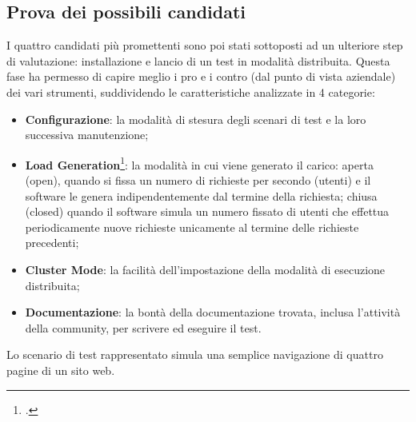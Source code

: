 \subsection{Prova dei possibili candidati}
I quattro candidati più promettenti sono poi stati sottoposti ad un ulteriore step di valutazione: installazione e lancio di un test in modalità distribuita. Questa fase ha permesso di capire meglio i pro e i contro (dal punto di vista aziendale) dei vari strumenti, suddividendo le caratteristiche analizzate in 4 categorie:
\begin{itemize}
	\item \textbf{Configurazione}: la modalità di stesura degli scenari di test e la loro successiva manutenzione;
	\item \textbf{Load Generation}\footcite{article:open-closed}: la modalità in cui viene generato il carico: aperta (open), quando si fissa un numero di richieste per secondo (utenti) e il software le genera indipendentemente dal termine della richiesta; chiusa (closed) quando il software simula un numero fissato di utenti che effettua periodicamente nuove richieste unicamente al termine delle richieste precedenti;
	\item \textbf{Cluster Mode}: la facilità dell'impostazione della modalità di esecuzione distribuita;
	\item \textbf{Documentazione}: la bontà della documentazione trovata, inclusa l'attività della community, per scrivere ed eseguire il test.
\end{itemize}
Lo scenario di test rappresentato simula una semplice navigazione di quattro pagine di un sito web.\\
\newpage
